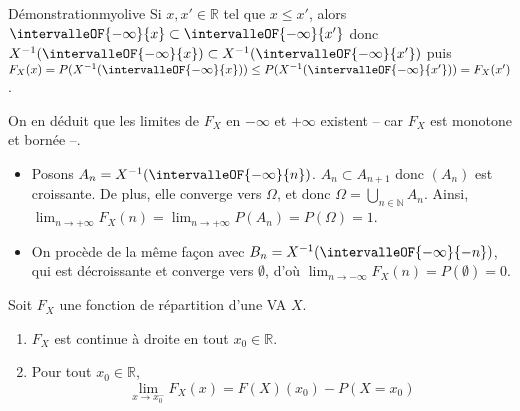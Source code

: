     \begin{demo}{Démonstration}{myolive}
        Si $x,x' \in \mathbb{R}$ tel que $x \leq x'$, alors $\intervalleOF{-\infty}{x} \subset \intervalleOF{-\infty}{x'}$ donc $X^{-1}(\intervalleOF{-\infty}{x}) \subset X^{-1}(\intervalleOF{-\infty}{x'})$ puis $F_X(x) = P(X^{-1}(\intervalleOF{-\infty}{x})) \leq P(X^{-1}(\intervalleOF{-\infty}{x'})) = F_X(x')$.

        On en déduit que les limites de $F_X$ en $-\infty$ et $+\infty$ existent -- car $F_X$ est monotone et bornée --. 
        \begin{itemize}
            \item Posons $A_n = X^{-1}(\intervalleOF{-\infty}{n})$. $A_n \subset A_{n+1}$ donc $(A_n)$ est croissante. De plus, elle converge vers $\Omega$, et donc $\Omega = \bigcup_{n \in \mathbb{N}} A_n$. Ainsi, $\lim_{n \to +\infty} F_X(n) = \lim_{n \to +\infty} P(A_n) = P(\Omega) = 1$.
            \item On procède de la même façon avec $B_n = X^{-1}(\intervalleOF{-\infty}{-n})$, qui est décroissante et converge vers $\emptyset$, d’où $\lim_{n \to -\infty} F_X(n) = P(\emptyset) = 0$.
        \end{itemize}
    \end{demo}

    \begin{prop}{}{}
        Soit $F_X$ une fonction de répartition d’une VA $X$. 
        \begin{enumerate}
            \item $F_X$ est continue à droite en tout $x_0 \in \mathbb{R}$.
            \item Pour tout $x_0 \in \mathbb{R}$, 
            \[ \lim_{x \to x_0^-} F_X(x) = F(X)(x_0) - P(X = x_0) \]   
        \end{enumerate}
    \end{prop}


